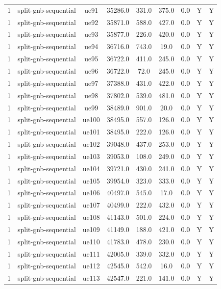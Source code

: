 \begin{table}[ht]
\begin{tabular}{|c|c|c|c|c|c|c|c|c|}
1 & split-gnb-sequential & ue91 & 35286.0 & 331.0 & 375.0 & 0.0 & Y & Y \\
1 & split-gnb-sequential & ue92 & 35871.0 & 588.0 & 427.0 & 0.0 & Y & Y \\
1 & split-gnb-sequential & ue93 & 35877.0 & 226.0 & 420.0 & 0.0 & Y & Y \\
1 & split-gnb-sequential & ue94 & 36716.0 & 743.0 & 19.0 & 0.0 & Y & Y \\
1 & split-gnb-sequential & ue95 & 36722.0 & 411.0 & 245.0 & 0.0 & Y & Y \\
1 & split-gnb-sequential & ue96 & 36722.0 & 72.0 & 245.0 & 0.0 & Y & Y \\
1 & split-gnb-sequential & ue97 & 37388.0 & 431.0 & 422.0 & 0.0 & Y & Y \\
1 & split-gnb-sequential & ue98 & 37802.0 & 539.0 & 481.0 & 0.0 & Y & Y \\
1 & split-gnb-sequential & ue99 & 38489.0 & 901.0 & 20.0 & 0.0 & Y & Y \\
1 & split-gnb-sequential & ue100 & 38495.0 & 557.0 & 126.0 & 0.0 & Y & Y \\
1 & split-gnb-sequential & ue101 & 38495.0 & 222.0 & 126.0 & 0.0 & Y & Y \\
1 & split-gnb-sequential & ue102 & 39048.0 & 437.0 & 253.0 & 0.0 & Y & Y \\
1 & split-gnb-sequential & ue103 & 39053.0 & 108.0 & 249.0 & 0.0 & Y & Y \\
1 & split-gnb-sequential & ue104 & 39721.0 & 430.0 & 241.0 & 0.0 & Y & Y \\
1 & split-gnb-sequential & ue105 & 39954.0 & 323.0 & 333.0 & 0.0 & Y & Y \\
1 & split-gnb-sequential & ue106 & 40497.0 & 545.0 & 17.0 & 0.0 & Y & Y \\
1 & split-gnb-sequential & ue107 & 40499.0 & 222.0 & 432.0 & 0.0 & Y & Y \\
1 & split-gnb-sequential & ue108 & 41143.0 & 501.0 & 224.0 & 0.0 & Y & Y \\
1 & split-gnb-sequential & ue109 & 41149.0 & 188.0 & 421.0 & 0.0 & Y & Y \\
1 & split-gnb-sequential & ue110 & 41783.0 & 478.0 & 230.0 & 0.0 & Y & Y \\
1 & split-gnb-sequential & ue111 & 42005.0 & 339.0 & 332.0 & 0.0 & Y & Y \\
1 & split-gnb-sequential & ue112 & 42545.0 & 542.0 & 16.0 & 0.0 & Y & Y \\
1 & split-gnb-sequential & ue113 & 42547.0 & 221.0 & 141.0 & 0.0 & Y & Y \\

\end{tabular}
\end{table}
